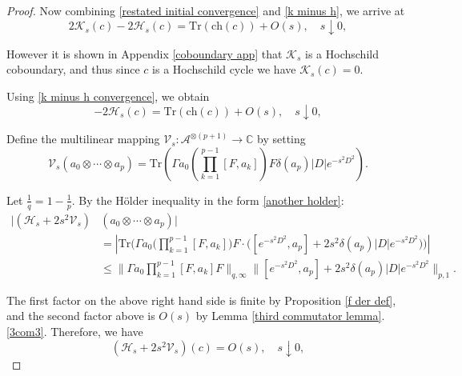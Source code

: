 \begin{proof}
        Now combining \eqref{restated initial convergence} and \eqref{k minus h}, we arrive at
        \begin{equation}\label{k minus h convergence}
            2\mathcal{K}_s(c)-2\mathcal{H}_s(c) = \mathrm{Tr}(\mathrm{ch}(c))+O(s),\quad s\downarrow0,
        \end{equation}

        However it is shown in Appendix \ref{coboundary app} that $\mathcal{K}_s$ is a Hochschild coboundary, and thus since $c$ is a Hochschild cycle we have $\mathcal{K}_s(c) = 0$.
        
        Using \eqref{k minus h convergence}, we obtain
        \begin{equation}\label{minus h convergence}
            -2\mathcal{H}_s(c) = \mathrm{Tr}(\mathrm{ch}(c))+O(s),\quad s\downarrow0,
        \end{equation}

        Define the multilinear mapping $\mathcal{V}_s:\mathcal{A}^{\otimes (p+1)}\to\mathbb{C}$ by setting
        \begin{equation*}
            \mathcal{V}_s(a_0\otimes\cdots\otimes a_p) = \mathrm{Tr}(\Gamma a_0\left(\prod_{k=1}^{p-1}[F,a_k]\right)F\delta(a_p)|D|e^{-s^2D^2}).
        \end{equation*}

        Let $\frac{1}{q} = 1-\frac{1}{p}$. By the H\"older inequality in the form \eqref{another holder}:
        \begin{align*}
            |(\mathcal{H}_s+2s^2\mathcal{V}_s)&(a_0\otimes\cdots\otimes a_p)| \\
                    &= \left|\mathrm{Tr}\Big(\Gamma a_0\Big(\prod_{k=1}^{p-1}[F,a_k]\Big)F\cdot\Big([e^{-s^2D^2},a_p]+2s^2\delta(a_p)|D|e^{-s^2D^2}\Big)\Big)\right|\\
                    &\leq \Big\|\Gamma a_0\prod_{k=1}^{p-1}[F,a_k]F\Big\|_{q,\infty}\Big\|[e^{-s^2D^2},a_p]+2s^2\delta(a_p)|D|e^{-s^2D^2}\Big\|_{p,1}.
        \end{align*}

        The first factor on the above right hand side is finite by Proposition \ref{f der def}, and the second factor above is $O(s)$ by Lemma \ref{third commutator lemma}.\eqref{3com3}. Therefore, we have
        \begin{equation}\label{h minus v}
            (\mathcal{H}_s+2s^2\mathcal{V}_s)(c) = O(s),\quad s\downarrow0,
        \end{equation}


\end{proof}

